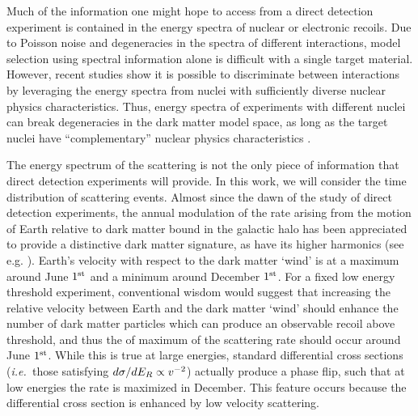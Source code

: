 \documentclass[11pt]{article}
\newcommand{\ie}{{\it i.e.~}}  \newcommand{\eg}{{\it e.g.~}}
\newcommand{\sjwColor}{red}
\newcommand{\sjw}[1]{{\color{\sjwColor} #1}}
\begin{document}
Much of the information one might hope to access from a direct detection experiment is contained in the energy spectra of nuclear or electronic recoils. Due to Poisson noise and degeneracies in the spectra of different interactions, model selection using spectral information alone is difficult with a single target material. However, recent studies show it is possible to discriminate between interactions by leveraging the energy spectra from nuclei with sufficiently diverse nuclear physics characteristics. Thus, energy spectra of experiments with different nuclei can break degeneracies in the dark matter model space, as long as the target nuclei have ``complementary'' nuclear physics characteristics \cite{McDermott:2011hx,Peter:2013aha,Gluscevic:2014vga,Catena:2014epa,Catena:2014hla,Dent:2015zpa,Gluscevic:2015sqa,Ruppin:2014bra}.

The energy spectrum of the scattering is not the only piece of information that direct detection experiments will provide. In this work, we will consider the time distribution of scattering events. Almost since the dawn of the study of direct detection experiments, the annual modulation of the rate \cite{Freese:1987wu} arising from the motion of Earth relative to dark matter bound in the galactic halo has been appreciated to provide a distinctive dark matter signature, as have its higher harmonics (see e.g. \cite{Freese:2012xd,Lee:2013xxa,Britto:2014wga,DelNobile:2015nua,Kouvaris:2015xga}). \sjw{Earth's velocity with respect to the dark matter `wind' is at a maximum around June $1^{\rm st}$ and a minimum around December $1^{\rm st}$. For a fixed low energy threshold experiment, conventional wisdom would suggest that increasing the relative velocity between Earth and the dark matter `wind' should enhance the number of dark matter particles which can produce an observable recoil above threshold, and thus the of maximum of the scattering rate should occur around June $1^{\rm st}$. While this is true at large energies, standard differential cross sections (\ie those satisfying $d\sigma/dE_R \propto v^{-2}$) actually produce a phase flip, such that at low energies the rate is maximized in December. This feature occurs because the differential cross section is enhanced by low velocity scattering. }
\end{document}
